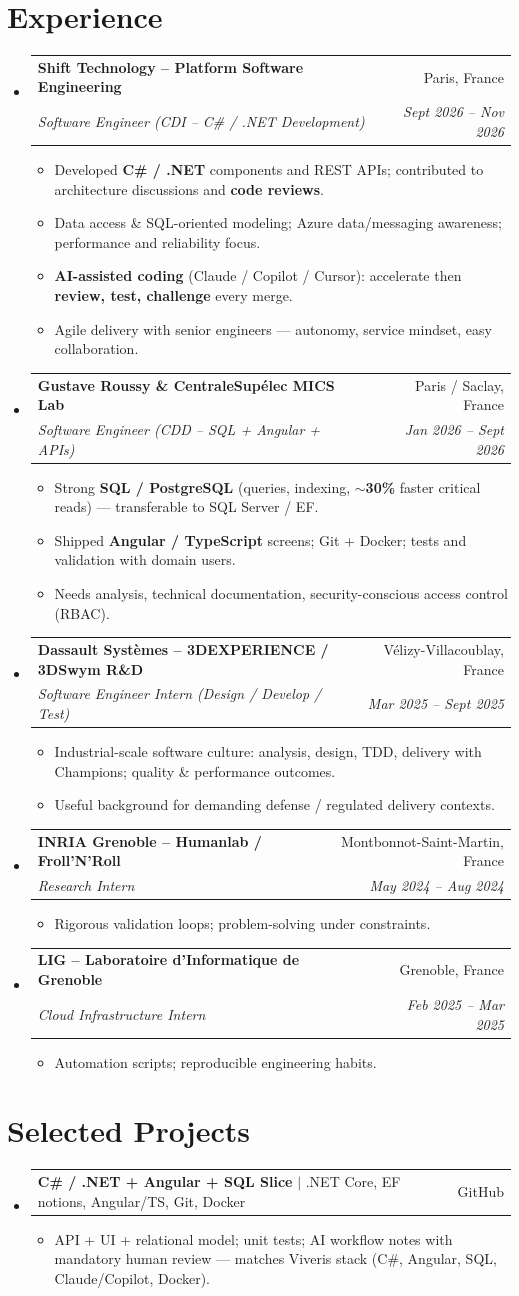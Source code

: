 \documentclass[letterpaper,10.5pt]{article}
\makeatletter
\newcommand{\resumeItem}[1]{\item\small{#1 \vspace{-1.5pt}}}
\newcommand{\resumeSubheading}[4]{\vspace{-1pt}\item\begin{tabular*}{0.97\textwidth}[t]{l@{\extracolsep{\fill}}r}\textbf{#1} & #2 \\\textit{\small#3} & \textit{\small #4} \\\end{tabular*}\vspace{-5pt}}
\newcommand{\resumeProjectHeading}[2]{\item\begin{tabular*}{0.97\textwidth}{l@{\extracolsep{\fill}}r}\small#1 & #2 \\\end{tabular*}\vspace{-5pt}}
\newcommand{\resumeSubHeadingListStart}{\begin{itemize}[leftmargin=0.15in, label={}]}
\newcommand{\resumeSubHeadingListEnd}{\end{itemize}}
\newcommand{\resumeItemListStart}{\begin{itemize}[leftmargin=0.18in]}
\newcommand{\resumeItemListEnd}{\end{itemize}\vspace{-3pt}}
\makeatother
\begin{document}
\section{Experience}
\resumeSubHeadingListStart
  \resumeSubheading
    {Shift Technology -- Platform Software Engineering}{Paris, France}
    {Software Engineer (CDI -- C\# / .NET Development)}{Sept 2026 -- Nov 2026}
    \resumeItemListStart
      \resumeItem{Developed \textbf{C\# / .NET} components and REST APIs; contributed to architecture discussions and \textbf{code reviews}.}
      \resumeItem{Data access \& SQL-oriented modeling; Azure data/messaging awareness; performance and reliability focus.}
      \resumeItem{\textbf{AI-assisted coding} (Claude / Copilot / Cursor): accelerate then \textbf{review, test, challenge} every merge.}
      \resumeItem{Agile delivery with senior engineers --- autonomy, service mindset, easy collaboration.}
    \resumeItemListEnd
  \resumeSubheading
    {Gustave Roussy \& CentraleSup\'elec MICS Lab}{Paris / Saclay, France}
    {Software Engineer (CDD -- SQL + Angular + APIs)}{Jan 2026 -- Sept 2026}
    \resumeItemListStart
      \resumeItem{Strong \textbf{SQL / PostgreSQL} (queries, indexing, \textbf{$\sim$30\%} faster critical reads) --- transferable to SQL Server / EF.}
      \resumeItem{Shipped \textbf{Angular / TypeScript} screens; Git + Docker; tests and validation with domain users.}
      \resumeItem{Needs analysis, technical documentation, security-conscious access control (RBAC).}
    \resumeItemListEnd
  \resumeSubheading
    {Dassault Syst\`emes -- 3DEXPERIENCE / 3DSwym R\&D}{V\'elizy-Villacoublay, France}
    {Software Engineer Intern (Design / Develop / Test)}{Mar 2025 -- Sept 2025}
    \resumeItemListStart
      \resumeItem{Industrial-scale software culture: analysis, design, TDD, delivery with Champions; quality \& performance outcomes.}
      \resumeItem{Useful background for demanding defense / regulated delivery contexts.}
    \resumeItemListEnd
  \resumeSubheading
    {INRIA Grenoble -- Humanlab / Froll'N'Roll}{Montbonnot-Saint-Martin, France}
    {Research Intern}{May 2024 -- Aug 2024}
    \resumeItemListStart
      \resumeItem{Rigorous validation loops; problem-solving under constraints.}
    \resumeItemListEnd
  \resumeSubheading
    {LIG -- Laboratoire d'Informatique de Grenoble}{Grenoble, France}
    {Cloud Infrastructure Intern}{Feb 2025 -- Mar 2025}
    \resumeItemListStart
      \resumeItem{Automation scripts; reproducible engineering habits.}
    \resumeItemListEnd
\resumeSubHeadingListEnd
\section{Selected Projects}
\resumeSubHeadingListStart
  \resumeProjectHeading{\textbf{C\# / .NET + Angular + SQL Slice} $|$ .NET Core, EF notions, Angular/TS, Git, Docker}{GitHub}
    \resumeItemListStart
      \resumeItem{API + UI + relational model; unit tests; AI workflow notes with mandatory human review --- matches Viveris stack (C\#, Angular, SQL, Claude/Copilot, Docker).}
    \resumeItemListEnd
\resumeSubHeadingListEnd
\end{document}
